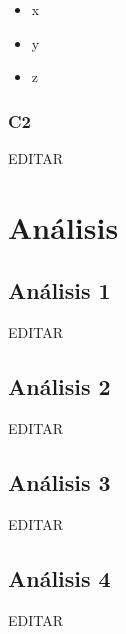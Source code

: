 \documentclass[preprint,12pt]{elsarticle}
\begin{document}
\begin{itemize}

\item x
\item y
\item z

\end{itemize}
\subsubsection{\textbf{C2}}

EDITAR\\


 



\section{Análisis}

\subsection{\textbf{Análisis 1}}
EDITAR\\

\subsection{\textbf{Análisis 2}}
EDITAR\\

\subsection{\textbf{Análisis 3}}
EDITAR\\

\subsection{\textbf{Análisis 4}}
EDITAR\\



\end{document}
